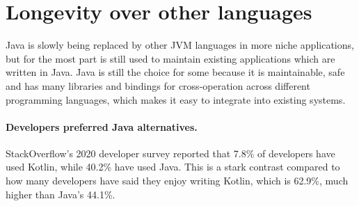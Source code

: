 \documentclass{article}
\begin{document}
  \newpage
  \section{Longevity over other languages}
  Java is slowly being replaced by other JVM languages in more niche applications, but for the most part is still used to maintain existing applications which are written in Java.
  Java is still the choice for some because it is maintainable, safe and has many libraries and bindings for cross-operation across different programming languages, which makes it easy to integrate into existing systems.
  
  \paragraph{Developers preferred Java alternatives.}
  StackOverflow's 2020 developer survey reported that 7.8\% of developers have used Kotlin, while 40.2\% have used Java.
  This is a stark contrast compared to how many developers have said they enjoy writing Kotlin, which is 62.9\%, much higher than Java's 44.1\%.
\end{document}
